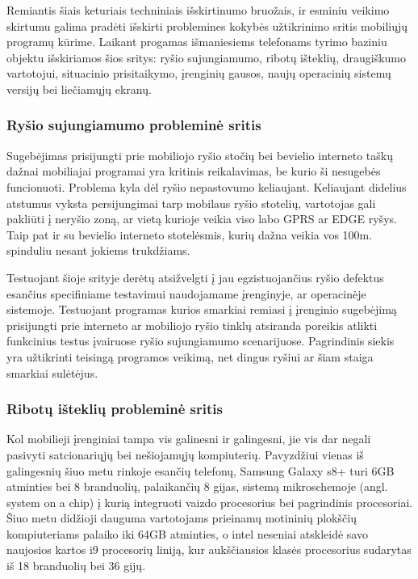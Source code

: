 \documentclass{VUMIFPSkursinis}
\begin{document}
Remiantis šiais keturiais techniniais išskirtinumo bruožais, ir esminiu veikimo skirtumu galima pradėti išskirti problemines kokybės užtikrinimo sritis mobiliųjų programų kūrime. Laikant progamas išmaniesiems telefonams tyrimo baziniu objektu išskiriamos šios sritys: ryšio sujungiamumo, ribotų išteklių, draugiškumo vartotojui, situacinio prisitaikymo, įrenginių gausos, naujų operacinių sistemų versijų bei liečiamųjų ekranų.

\subsubsection{Ryšio sujungiamumo probleminė sritis}
Sugebėjimas prisijungti prie mobiliojo ryšio stočių bei bevielio interneto taškų dažnai mobiliajai programai yra kritinis reikalavimas, be kurio ši nesugebės funcionuoti. Problema kyla dėl ryšio nepastovumo keliaujant. Keliaujant didelius atstumus vyksta persijungimai tarp mobilaus ryšio stotelių, vartotojas gali pakliūti į neryšio zoną, ar vietą kurioje veikia viso labo GPRS ar EDGE ryšys. Taip pat ir su bevielio interneto stotelėsmis, kurių dažna veikia vos 100m. spinduliu nesant jokiems trukdžiams. 

Testuojant šioje srityje derėtų atsižvelgti į jau egzistuojančius ryšio defektus esančius specifiniame testavimui naudojamame įrenginyje, ar operacinėje sistemoje. \cite{android_bugs} Testuojant programas kurios smarkiai remiasi į įrenginio sugebėjimą prisijungti prie interneto ar mobiliojo ryšio tinklų atsiranda poreikis atlikti funkcinius testus įvairuose ryšio sujungiamumo scenarijuose. Pagrindinis siekis yra užtikrinti teisingą programos veikimą, net dingus ryšiui ar šiam staiga smarkiai sulėtėjus.

\subsubsection{Ribotų išteklių probleminė sritis}
Kol mobilieji įrenginiai tampa vis galinesni ir galingesni, jie vis dar negali pasivyti satcionariųjų bei nešiojamųjų kompiuterių. Pavyzdžiui vienas iš galingesnių šiuo metu rinkoje esančių telefonų, Samsung Galaxy s8+ turi 6GB atminties bei 8 branduolių, palaikančių 8 gijas, sistemą mikroschemoje (angl. system on a chip) į kurią integruoti vaizdo procesorius bei pagrindinis procesoriai. \cite{samsung_s8} Šiuo metu didžioji dauguma vartotojams prieinamų motininių plokščių kompiuteriams palaiko iki 64GB atminties, o intel neseniai atskleidė savo naujosios kartos i9 procesorių liniją, kur aukščiausios klasės procesorius sudarytas iš 18 branduolių bei 36 gijų. \cite{intel_i9}
\end{document}
